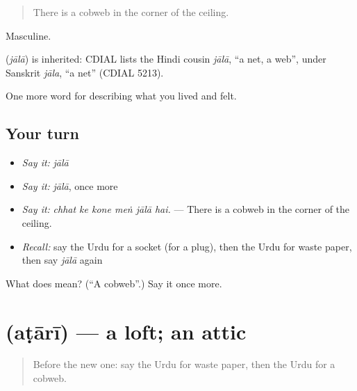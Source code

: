 \begin{quote}
There is a cobweb in the corner of the ceiling.
\end{quote}

Masculine.

\begin{cousinweb}
\textbf{} (\emph{jālā}) is inherited: CDIAL lists the Hindi cousin \emph{jālā}, \textquotedblleft{}a net, a web\textquotedblright{}, under Sanskrit \emph{jāla}, \textquotedblleft{}a net\textquotedblright{} (CDIAL 5213).
\end{cousinweb}

\begin{grammarlens}[title={What you've built}]
One more word for describing what you lived and felt.
\end{grammarlens}

\subsection*{Your turn}
\begin{itemize}
\raggedright
  \item \emph{Say it:} \emph{jālā}
  \item \emph{Say it:} \emph{jālā}, once more
  \item \emph{Say it:} \emph{chhat ke kone meṅ jālā hai.} — There is a cobweb in the corner of the ceiling.
  \item \emph{Recall:} say the Urdu for a socket (for a plug), then the Urdu for waste paper, then say \emph{jālā} again
\end{itemize}

\begin{tcolorbox}[breakable,colback=teal!4,colframe=teal!35!black,title={Before you move on}]
What does  mean? (\textquotedblleft{}A cobweb\textquotedblright{}.) Say it once more.
\end{tcolorbox}
\section[\texorpdfstring{\ur{اٹاری} (aṭārī)}{اٹاری (aṭārī)}]{ (aṭārī) — a loft; an attic}

\label{lesson:UR-C505-atari}



\begin{quote}
Before the new one: say the Urdu for waste paper, then the Urdu for a cobweb.
\end{quote}

